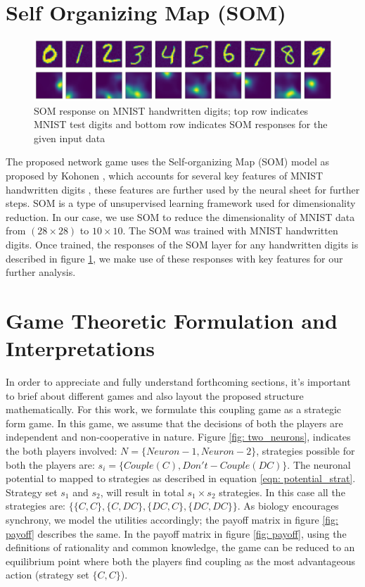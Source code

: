 \documentclass{article}
\begin{document}
\section{Self Organizing Map (SOM)}
\label{somsec}
\begin{figure}
 \centering
 \includegraphics[width=1.\textwidth]{som_response.png}
 \caption{SOM response on MNIST handwritten digits; top row indicates MNIST test digits and bottom row indicates SOM responses for the given input data}
 \label{fig: som_response}
\end{figure}
The proposed network game uses the Self-organizing Map (SOM) model as proposed by Kohonen \cite{kohonen1982self}, which accounts for several key features of MNIST handwritten digits \cite{lecun-mnisthandwrittendigit-2010}, these features are further used by the neural sheet for further steps. SOM is a type of unsupervised learning framework used for dimensionality reduction. In our case, we use SOM to reduce the dimensionality of MNIST data from $(28\times28)$ to $10\times10$. The SOM was trained with MNIST handwritten digits. Once trained, the responses of the SOM layer for any handwritten digits is described in figure \ref{fig: som_response}, we make use of these responses with key features for our further analysis.

\section{Game Theoretic Formulation and Interpretations}
\label{gameforintep}

In order to appreciate and fully understand forthcoming sections, it's important to brief about different games and also layout the proposed structure mathematically. For this work, we formulate this coupling game as a strategic form game. In this game, we assume that the decisions of both the players are independent and non-cooperative in nature. Figure \ref{fig: two_neurons}, indicates the both players involved: $N = \{Neuron-1, Neuron-2\}$, strategies possible for both the players are: $s_i = \{Couple(C), Don't-Couple(DC)\}$. The neuronal potential to mapped to strategies as described in equation \ref{eqn: potential_strat}. Strategy set ${s_1}$ and ${s_2}$, will result in total $s_1 \times s_2$ strategies. In this case all the strategies are: $\{\{C, C\}, \{C, DC\}, \{DC, C\}, \{DC, DC\}\}$. As biology encourages synchrony, we model the utilities accordingly; the payoff matrix in figure \ref{fig: payoff} describes the same.
In the payoff matrix in figure \ref{fig: payoff}, using the definitions of rationality and common knowledge, the game can be reduced to an equilibrium point where both the players find coupling as the most advantageous action (strategy set $\{C, C\}$). 
\end{document}
